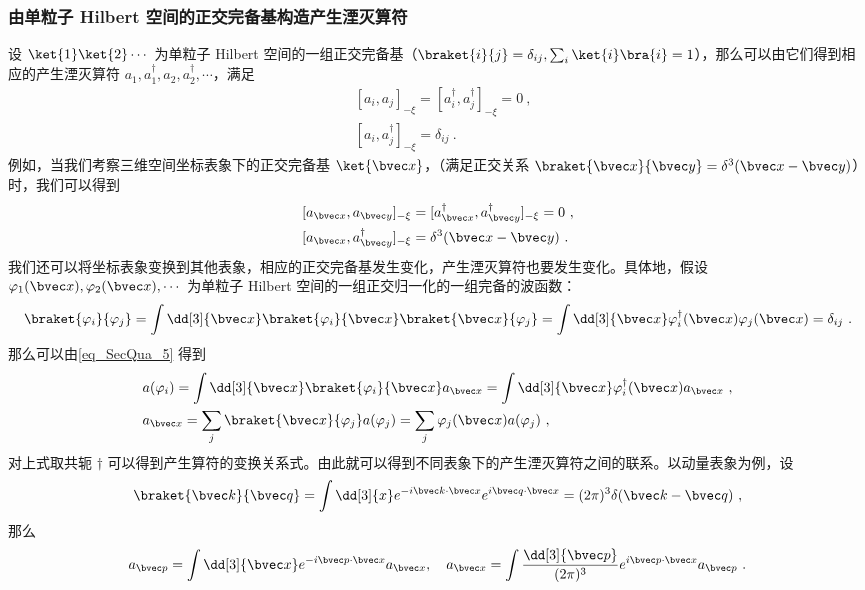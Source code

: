 \subsubsection{由单粒子 Hilbert 空间的正交完备基构造产生湮灭算符}
设 $\ket{1}\ket{2}\cdots$ 为单粒子 Hilbert 空间的一组正交完备基（$\braket{i}{j}=\delta_{ij},\sum_i\ket{i}\bra{i}=1$），那么可以由它们得到相应的产生湮灭算符 $a_1,a^\dagger_1,a_2,a^\dagger_2,\cdots$，满足
\begin{equation}
\begin{aligned}
&[a_i,a_j]_{-\xi}=[a_i^\dagger,a_j^\dagger]_{-\xi}=0~,\\
&[a_i,a_j^\dagger]_{-\xi}=\delta_{ij}~.
\end{aligned}
\end{equation}
例如，当我们考察三维空间坐标表象下的正交完备基 $\ket{\bvec x}$，（满足正交关系 $\braket{\bvec x}{\bvec y}=\delta^3(\bvec x-\bvec y)$）时，我们可以得到
\begin{equation}
\begin{aligned}
&[a_{\bvec x},a_{\bvec y}]_{-\xi}=[a_{\bvec x}^\dagger,a_{\bvec y}^\dagger]_{-\xi}=0~,\\
&[a_{\bvec x},a_{\bvec y}^\dagger]_{-\xi}=\delta^3(\bvec x-\bvec y)~.
\end{aligned}
\end{equation}
我们还可以将坐标表象变换到其他表象，相应的正交完备基发生变化，产生湮灭算符也要发生变化。具体地，假设 $\varphi_1(\bvec x),\varphi_2(\bvec x),\cdots$ 为单粒子 Hilbert 空间的一组正交归一化的一组完备的波函数：
\begin{equation}
\braket{\varphi_i}{\varphi_j}=\int \dd[3]{\bvec x}\braket{\varphi_i}{\bvec x}\braket{\bvec x}{\varphi_j}=\int \dd[3]{\bvec x} \varphi_i^\dagger(\bvec x)\varphi_j(\bvec x) =\delta_{ij} ~.
\end{equation}
那么可以由\autoref{eq_SecQua_5} 得到
\begin{equation}\label{eq_SecQua_8}
\begin{aligned}
&a(\varphi_i) = \int \dd[3]{\bvec x} \braket{\varphi_i}{\bvec x} a_{\bvec x}=\int \dd[3]{\bvec x} \varphi_i^\dagger(\bvec x) a_{\bvec x}~,\\
&a_{\bvec x} = \sum_j \braket{\bvec x}{\varphi_j} a(\varphi_j) = \sum_j \varphi_j(\bvec x)a(\varphi_j)~,
\end{aligned}
\end{equation}
对上式取共轭 $\dagger$ 可以得到产生算符的变换关系式。由此就可以得到不同表象下的产生湮灭算符之间的联系。以动量表象为例，设
\begin{equation}
\braket{\bvec k}{\bvec q}=\int \dd[3]{x} e^{-i\bvec k\cdot \bvec x} e^{i\bvec q\cdot \bvec x} = (2\pi)^3 \delta(\bvec k-\bvec q)~,
\end{equation}
那么
\begin{equation}
a_{\bvec p}=\int \dd[3]{\bvec x} e^{-i\bvec p\cdot \bvec x} a_{\bvec x},\quad a_{\bvec x}=\int \frac{\dd[3]{\bvec p}}{(2\pi)^3}e^{i\bvec p\cdot \bvec x}a_{\bvec p}~.
\end{equation}

